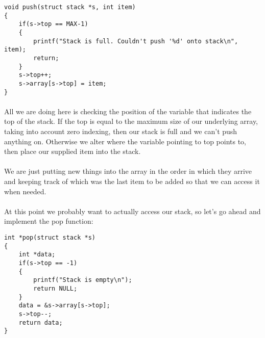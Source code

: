 \documentclass[10pt, a4paper, twosize]{article}
\begin{document}
\begin{lstlisting}
void push(struct stack *s, int item)
{
    if(s->top == MAX-1)
    {   
        printf("Stack is full. Couldn't push '%d' onto stack\n", item);
        return;
    }
    s->top++;
    s->array[s->top] = item;
}
\end{lstlisting}

\paragraph{} All we are doing here is checking the position of the variable that indicates the top of the stack. If the top is equal to the maximum size of our underlying array, taking into account zero indexing, then our stack is full and we can't push anything on. Otherwise we alter where the variable pointing to top points to, then place our supplied item into the stack.

\paragraph{} We are just putting new things into the array in the order in which they arrive and keeping track of which was the last item to be added so that we can access it when needed.

\paragraph{} At this point we probably want to actually access our stack, so let's go ahead and implement the pop function:

\begin{lstlisting}
int *pop(struct stack *s)
{
    int *data;
    if(s->top == -1)
    {
        printf("Stack is empty\n");
        return NULL;
    }
    data = &s->array[s->top];
    s->top--;
    return data;
}
\end{lstlisting}
\end{document}
